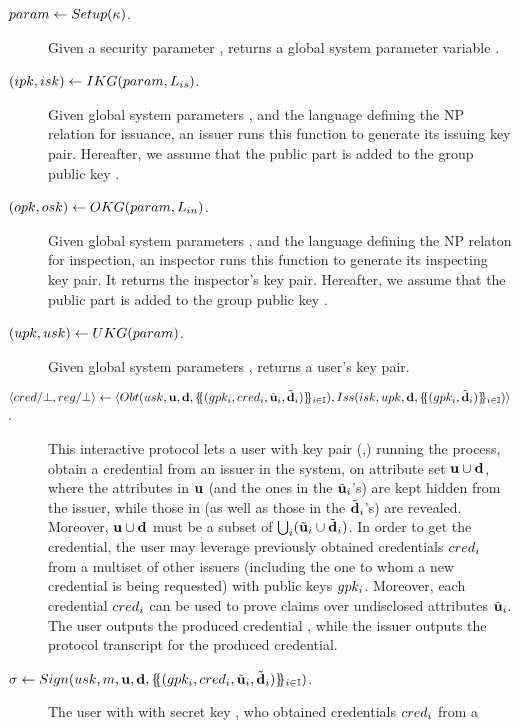 \begin{description}
\item[$param \gets Setup(\kappa)$.] Given a security parameter \secpar,
  returns a global system parameter variable \parm.
\item[$(ipk,isk) \gets IKG(param,L_{is})$.] Given global system
  parameters \parm, and the language \LangIss defining the NP relation for
  issuance, an issuer runs this function to generate its issuing key pair.
  Hereafter, we assume that the public part \ipk is added to the group public
  key \gpk.
\item[$(opk,osk) \gets OKG(param,L_{in})$.] Given global system
  parameters \parm, and the language \LangIns defining the NP relaton for
  inspection, an inspector runs this function to generate its inspecting key
  pair. It returns the inspector's key pair. Hereafter, we assume that the
  public part \opk is added to the group public key \gpk.
\item[$(upk,usk) \gets UKG(param)$.] Given global system parameters
  \parm, returns a user's key pair.
\item[$\langle cred/\bot,reg/\bot \rangle \gets
  \langle
  Obt(usk,\mathbf{u},\mathbf{d},\{\mskip-5mu\{ (gpk_i,cred_i,\tilde{\mathbf{u}}_i,\tilde{\mathbf{d}}_i)\}\mskip-5mu\}_{i \in \mathbb{I}}),
  Iss(isk,upk,\mathbf{d},\{\mskip-5mu\{ (gpk_i,\tilde{\mathbf{d}}_i)\}\mskip-5mu\}_{i \in \mathbb{I}})
  \rangle$.] %
  This interactive protocol lets a user with key pair (\upk,\usk) running the
  \Obtain process, obtain a credential \cred from an issuer in the system, on
  attribute set $\mathbf{u} \cup \mathbf{d}$, where the attributes in $\mathbf{u}$ (and
  the ones in the $\tilde{\mathbf{u}}_i$'s) are kept hidden from the issuer, while those
  in \dattrs (as well as those in the $\tilde{\mathbf{d}}_i$'s) are revealed. Moreover,
  $\mathbf{u} \cup \mathbf{d}$ must be a subset of $\bigcup_i (\tilde{\mathbf{u}}_i \cup
  \tilde{\mathbf{d}}_i)$. In order to get the credential, the user may leverage previously
  obtained credentials $cred_i$ from a multiset of other issuers (including the
  one to whom a new credential is being requested) with public keys $gpk_i$.
  Moreover, each credential $cred_i$ can be used to prove claims over
  undisclosed attributes $\tilde{\mathbf{u}}_i$. The user outputs the produced credential
  \cred, while the issuer outputs the protocol transcript \utrans for the
  produced credential.
\item[$\sigma \gets Sign(usk,m,\mathbf{u},\mathbf{d},
  \{\mskip-5mu\{ (gpk_i,cred_i,\tilde{\mathbf{u}}_i,\tilde{\mathbf{d}}_i)\}\mskip-5mu\}_{i \in \mathbb{I}})$.]
  The user with with secret key \usk, who obtained credentials $cred_i$ from a

\end{description}
